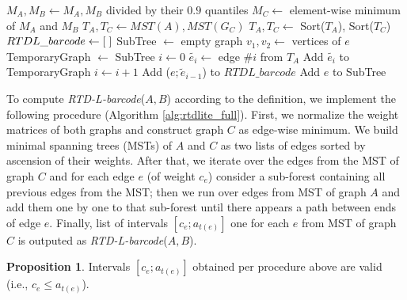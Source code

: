 \documentclass[twoside]{article}
\begin{document}
\begin{algorithm}[th!]
	\caption{Computation of RTD-Lite Barcode} 
    \label{alg:rtdlite_full}

	\begin{algorithmic}
	\State $M_A, M_B \leftarrow M_A, M_B$ divided by their $0.9$ quantiles
	\State $M_C \leftarrow $ element-wise minimum of $M_A$ and $M_B$
    \State $T_A, T_C \leftarrow MST(A), MST(G_C)$
    \State $T_A, T_C \leftarrow$ Sort($T_A$), Sort($T_C$)
    \State $RTDL\_barcode \leftarrow [\;\empty] $
    \State SubTree $\leftarrow$ empty graph
    \State $v_1, v_2 \leftarrow$ vertices of $e$
    \State TemporaryGraph $\leftarrow $ SubTree
    \State $i \leftarrow 0$
    \Repeat
    \State $\tilde{e_i} \leftarrow$ edge $\#i$ from $T_A$
    \State Add $\tilde{e_i}$ to TemporaryGraph
    \State $i \leftarrow i + 1$
    \State Add ($e; \tilde{e}_{i - 1}$) to $RTDL\_barcode$
    \State Add $e$ to SubTree
    \EndFor
	\EndProcedure
	\end{algorithmic}
\end{algorithm}

To compute \textit{RTD-L-barcode}($A, B$) according to the definition, we implement the following procedure (Algorithm \ref{alg:rtdlite_full}).
First, we normalize the weight matrices of both graphs
and construct graph $C$ as edge-wise minimum. We build minimal spanning trees (MSTs) of $A$ and $C$ as two lists of edges sorted by ascension of their weights. 
After that, we iterate over the edges from the MST of graph $C$ and for each edge $e$ (of weight $c_e$) consider a sub-forest containing all previous edges from the MST; then we run over edges from MST of graph $A$ and add them one by one to that sub-forest until there appears a path between ends of edge $e$. Finally, list of intervals $[c_e;a_{t(e)}]$ one for each $e$ from MST of graph $C$ is outputed as \textit{RTD-L-barcode}($A, B$).

\textbf{Proposition 1}. Intervals $[c_e;a_{t(e)}]$ obtained per procedure above are valid (i.e., $c_e \leq a_{t(e)}$).
\end{document}
